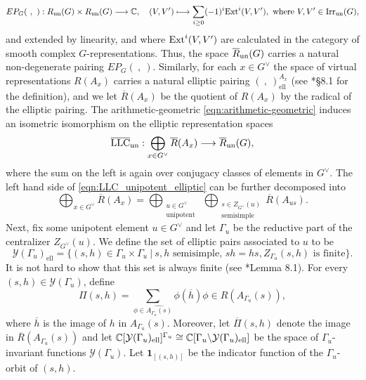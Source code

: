 \begin{equation*}
    EP_G(\ ,\ ):R_{\mathrm{un}}(G)\times R_{\mathrm{un}}(G)\longrightarrow\mathbb{C},\quad (V,V')\longmapsto\sum_{i\geq0}(-1)^i\mathrm{Ext}^i(V,V'),\text{ where }V,V'\in\mathrm{Irr}_{\mathrm{un}}(G),
\end{equation*}
and extended by linearity, and where $\mathrm{Ext}^i(V,V')$ are calculated in the category of smooth complex $G$-representations. Thus, the space $\overline{R}_{\mathrm{un}}(G)$ carries a natural non-degenerate pairing $EP_G(\ ,\ )$. Similarly, for each $x\in G^\vee$ the space of virtual representations $R(A_x)$ carries a natural elliptic pairing $(\ ,\ )^{A_x}_{\mathrm{ell}}$ (see \cite{AubertCiubotaruRomano2024}*{\S8.1} for the definition), and we let $\overline{R}(A_x)$ be the quotient of $R(A_x)$ by the radical of the elliptic pairing. The arithmetic-geometric \eqref{eqn:arithmetic-geometric} induces an isometric isomorphism on the elliptic representation spaces
\begin{equation}\label{eqn:LLC_unipotent_elliptic}
    \overline{\mathrm{LLC}}_{\mathrm{un}}:\bigoplus_{x\in G^\vee}\overline{R}(A_x)\longrightarrow\overline{R}_{\mathrm{un}}(G),
\end{equation}
where the sum on the left is again over conjugacy classes of elements in $G^\vee$. The left hand side of \eqref{eqn:LLC_unipotent_elliptic} can be further decomposed into
$$\bigoplus_{x\in G^\vee}\overline{R}(A_x)=\bigoplus_{\substack{u\in G^\vee\\\mathrm{unipotent}}}\ \bigoplus_{\substack{s\in Z_{G^\vee}(u)\\\mathrm{semisimple}}}\overline{R}(A_{us}).$$
Next, fix some unipotent element $u\in G^\vee$ and let $\Gamma_u$ be the reductive part of the centralizer $Z_{G^\vee}(u)$. We define the set of elliptic pairs associated to $u$ to be
$$\mathcal{Y}(\Gamma_u)_{\mathrm{ell}}=\{(s,h)\in\Gamma_u\times\Gamma_u\ |\ s,h\text{ semisimple, }sh=hs, Z_{\Gamma_u}(s,h)\text{ is finite}\}.$$
It is not hard to show that this set is always finite (see \cite{AubertCiubotaruRomano2024}*{Lemma 8.1}). For every $(s,h)\in\mathcal{Y}(\Gamma_u)$, define 
\begin{equation}\label{eqn:virtual_ellipticpair}
    \Pi(s,h)=\sum_{\phi\in\widehat{A_{\Gamma_u}(s)}}\phi(\overline{h})\phi\in R(A_{\Gamma_u}(s)),
\end{equation}
where $\overline{h}$ is the image of $h$ in $A_{\Gamma_u}(s)$. Moreover, let $\overline{\Pi}(s,h)$ denote the image in $\overline{R}(A_{\Gamma_u}(s))$ and let $\mathbb{C}[\mathcal{Y}(\Gamma_u)_{\mathrm{ell}}]^{\Gamma_u}\cong\mathbb{C}[\Gamma_u\backslash\mathcal{Y}(\Gamma_u)_{\mathrm{ell}}]$ be the space of $\Gamma_u$-invariant functions $\mathcal{Y}(\Gamma_u)$. Let $\mathbf{1}_{[(s,h)]}$ be the indicator function of the $\Gamma_u$-orbit of $(s,h)$. 
